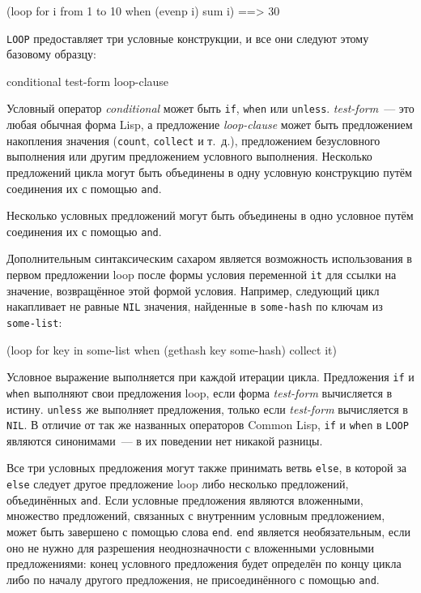 \begin{myverb}
(loop for i from 1 to 10 when (evenp i) sum i) ==> 30
\end{myverb}

\lstinline{LOOP} предоставляет три условные конструкции, и все они следуют этому базовому образцу:

\begin{myverb}
conditional test-form loop-clause
\end{myverb}

Условный оператор \textit{conditional} может быть \lstinline{if}, \lstinline{when} или
\lstinline{unless}. \textit{test-form}~--- это любая обычная форма Lisp, а предложение
\textit{loop-clause} может быть предложением накопления значения (\lstinline{count},
\lstinline{collect} и т.~д.), предложением безусловного выполнения или другим предложением
условного выполнения. Несколько предложений цикла могут быть объединены в одну условную
конструкцию путём соединения их с помощью \lstinline{and}.

Несколько условных предложений могут быть объединены в одно условное путём соединения их
с помощью \lstinline{and}.

Дополнительным синтаксическим сахаром является возможность использования в первом
предложении loop после формы условия переменной \lstinline{it} для ссылки на значение,
возвращённое этой формой условия. Например, следующий цикл накапливает не равные
\lstinline{NIL} значения, найденные в \lstinline{some-hash} по ключам из \lstinline{some-list}:

\begin{myverb}
(loop for key in some-list when (gethash key some-hash) collect it)
\end{myverb}

Условное выражение выполняется при каждой итерации цикла. Предложения \lstinline{if} и
\lstinline{when} выполняют свои предложения loop, если форма \textit{test-form} вычисляется в
истину. \lstinline{unless} же выполняет предложения, только если \textit{test-form} вычисляется
в \lstinline{NIL}. В отличие от так же названных операторов Common Lisp, \lstinline{if} и
\lstinline{when} в \lstinline{LOOP} являются синонимами~--- в их поведении нет никакой разницы.

Все три условных предложения могут также принимать ветвь \lstinline{else}, в которой за
\lstinline{else} следует другое предложение loop либо несколько предложений, объединённых
\lstinline{and}. Если условные предложения являются вложенными, множество предложений,
связанных с внутренним условным предложением, может быть завершено с помощью слова
\lstinline{end}. \lstinline{end} является необязательным, если оно не нужно для разрешения
неоднозначности с вложенными условными предложениями: конец условного предложения будет
определён по концу цикла либо по началу другого предложения, не присоединённого с помощью
\lstinline{and}.

